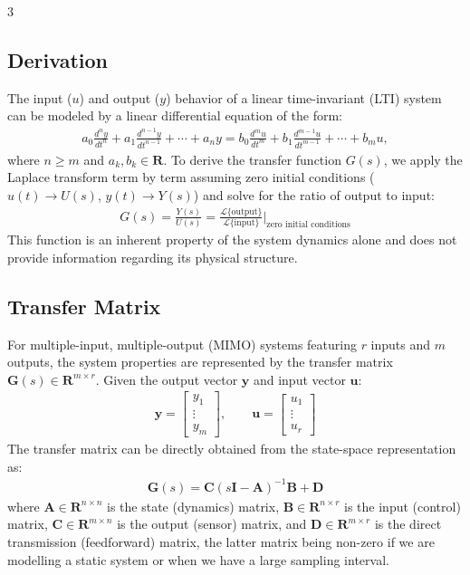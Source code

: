 \documentclass[10pt,landscape]{article}
\begin{document}
\begin{multicols*}{3}
    \subsection{Derivation}
    The input ($u$) and output ($y$) behavior of a linear time-invariant (LTI) system can be modeled by a linear differential equation of the form:
    \begin{align*}
        a_0\frac{d^ny}{dt^n}+a_1\frac{d^{n-1}y}{dt^{n-1}}+\cdots+a_ny=b_0\frac{d^mu}{dt^m}+b_1\frac{d^{m-1}u}{dt^{m-1}}+\cdots+b_mu,
    \end{align*}
    where $n\ge m$ and $a_k,b_k\in\mathbf{R}$. To derive the transfer function $G(s)$, we apply the Laplace transform term by term assuming zero initial conditions ($u(t) \rightarrow U(s)$, $y(t) \rightarrow Y(s)$) and solve for the ratio of output to input:
    \begin{align*}
        G(s)= \frac{Y(s)}{U(s)}=\frac{\mathcal{L}\{\text{output}\}}{\mathcal{L}\{\text{input}\}}\Bigg|_{\text{zero initial conditions}}
    \end{align*}
    This function is an inherent property of the system dynamics alone and does not provide information regarding its physical structure.
    \newline 

    \subsection{Transfer Matrix}
    For multiple-input, multiple-output (MIMO) systems featuring $r$ inputs and $m$ outputs, the system properties are represented by the transfer matrix $\mathbf{G}(s)\in \mathbf{R}^{m\times r}$. Given the output vector $\mathbf{y}$ and input vector $\mathbf{u}$:
    \begin{align*}            
        \mathbf{y} = 
        \begin{bmatrix}
        y_1 \\ 
        \vdots \\ 
        y_m
        \end{bmatrix},
        \quad\quad
        \mathbf{u} =
        \begin{bmatrix}
        u_1 \\ 
        \vdots \\ 
        u_r
        \end{bmatrix}
    \end{align*}
    The transfer matrix can be directly obtained from the state-space representation as:
    \begin{align*}
        \mathbf{G}(s)=\mathbf{C}(s\mathbf{I}-\mathbf{A})^{-1}\mathbf{B}+\mathbf{D}
    \end{align*}
    where $\mathbf{A}\in\mathbf{R}^{n \times n}$ is the state (dynamics) matrix, $\mathbf{B}\in\mathbf{R}^{n\times r}$ is the input (control) matrix, $\mathbf{C}\in\mathbf{R}^{m\times n}$ is the output (sensor) matrix, and $\mathbf{D}\in\mathbf{R}^{m\times r}$ is the direct transmission (feedforward) matrix, the latter matrix being non-zero if we are modelling a static system or when we have a large sampling interval.


\end{multicols*}
\end{document}
